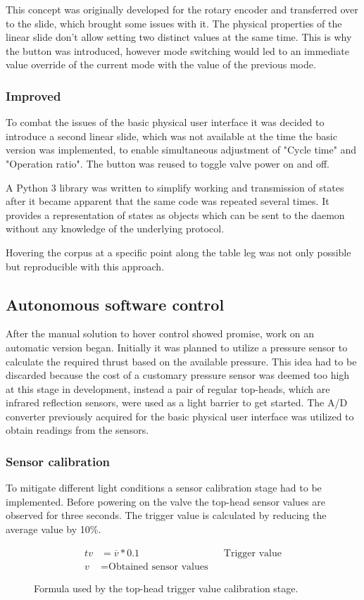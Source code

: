 This concept was originally developed for the rotary encoder and transferred over to the slide, which brought some issues with it. The physical properties of the linear slide don't allow setting two distinct values at the same time. This is why the button was introduced, however mode switching would led to an immediate value override of the current mode with the value of the previous mode.

\subsubsection{Improved}
To combat the issues of the basic physical user interface it was decided to introduce a second linear slide, which was not available at the time the basic version was implemented, to enable simultaneous adjustment of "Cycle time" and "Operation ratio". The button was reused to toggle valve power on and off.

A Python 3 library was written to simplify working and transmission of states after it became apparent that the same code was repeated several times. It provides a representation of states as objects which can be sent to the daemon without any knowledge of the underlying protocol. 

Hovering the corpus at a specific point along the table leg was not only possible but reproducible with this approach.   

\subsection{Autonomous software control}
After the manual solution to hover control showed promise, work on an automatic version began. Initially it was planned to utilize a pressure sensor to calculate the required thrust based on the available pressure. This idea had to be discarded because the cost of a customary pressure sensor was deemed too high at this stage in development, instead a pair of regular top-heads, which are infrared reflection sensors, were used as a light barrier to get started. The A/D converter previously acquired for the basic physical user interface was utilized to obtain readings from the sensors.

\subsubsection{Sensor calibration}
To mitigate different light conditions a sensor calibration stage had to be implemented. Before powering on the valve the top-head sensor values are observed for three seconds. The trigger value is calculated by reducing the average value by 10\%.
\begin{figure}[h]
\begin{align*}
    tv &=\overline{v} * 0.1 && \text{Trigger value} \\
    v &= \text{Obtained sensor values}
\end{align*}
\caption{Formula used by the top-head trigger value calibration stage.}
\end{figure}


